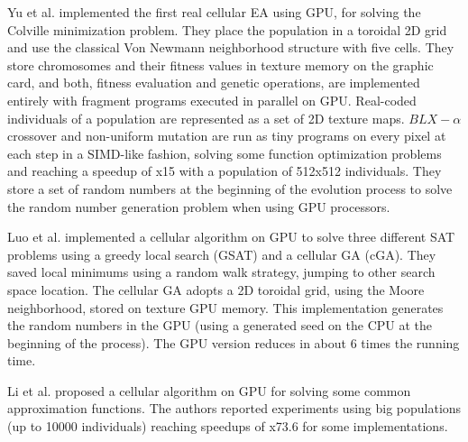 \documentclass[prodmode,acmtecs]{acmsmall}
\begin{document}



Yu et al. \cite{yu-parallel-2005} implemented the first real cellular EA using GPU, for solving the Colville minimization problem. They place the population in a toroidal 2D grid and use the classical Von Newmann neighborhood structure with five cells. They store chromosomes and their fitness values in texture memory on the graphic card, and both, fitness evaluation and genetic operations, are implemented entirely with fragment programs executed in parallel on GPU. Real-coded individuals of a population are represented as a set of 2D texture maps. $BLX-\alpha$ crossover and non-uniform mutation are run as tiny programs on every pixel at each step in a SIMD-like fashion, solving some function optimization problems and reaching a speedup of x15 with a population of 512x512 individuals. They store a set of random numbers at the beginning of the evolution process to solve the random number generation problem when using GPU processors. 

Luo et al. \cite{zhongwen-luo-cellular-2006} implemented a cellular algorithm on GPU to solve three different SAT problems 
using a greedy local search (GSAT) \cite{Selman93domain-independentextensions} and a cellular GA (cGA). 
They saved local minimums using a random walk strategy, jumping to other search space location. 
The cellular GA adopts a 2D toroidal grid, using the Moore neighborhood, stored on texture GPU memory. This implementation generates the random numbers in the GPU (using a generated seed on the CPU at the beginning of the process). 
The GPU version reduces in about 6 times the running time.

Li et al. \cite{jian-ming-li-efficient-2007} proposed a cellular algorithm on GPU for solving some common approximation functions. The authors reported experiments using big populations (up to 10000 individuals) reaching speedups of x73.6 for some implementations. 
\end{document}
